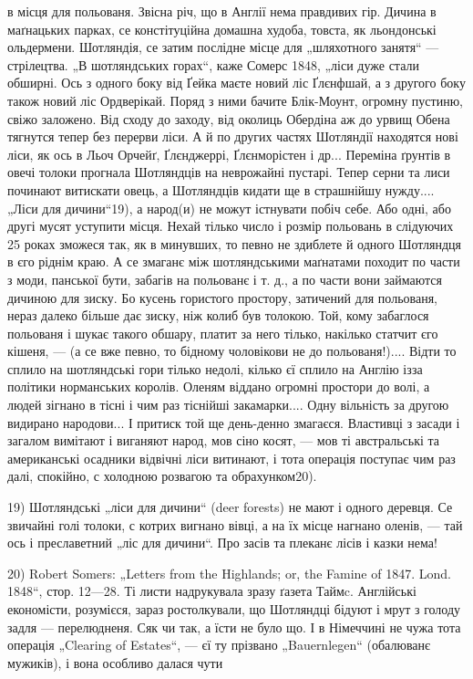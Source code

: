 в місця для польованя. Звісна річ, що в Англії нема правдивих гір. Дичина в маґнацьких парках, се констітуційна домашна худоба, товста, як льондонські ольдермени. Шотляндія, се затим послідне місце для „шляхотного занятя“ — стрілецтва. „В шотляндських горах“, каже Сомерс 1848, „ліси дуже стали обширні. Ось з одного боку від Ґейка маєте новий ліс Ґлєнфшай, а з другого боку також новий ліс Ордверікай. Поряд з ними бачите Блік-Моунт, огромну пустиню, свіжо заложено. Від сходу до заходу, від околиць Обердіна аж до урвищ Обена тягнутся тепер без перерви ліси. А й по других частях Шотляндії находятся нові ліси, як ось в Льоч Орчейґ, Ґлєнджеррі, Ґлєнморістен і др... Переміна ґрунтів в овечі толоки прогнала Шотляндців на неврожайні пустарі. Тепер серни та лиси починают витискати овець, а Шотляндців кидати ще в страшнійшу нужду.... „Ліси для дичини“19), а народ(и) не можут істнувати побіч себе. Або одні, або другі мусят уступити місця. Нехай тілько число і розмір польовань в слідуючих 25 роках зможеся так, як в минувших, то певно не здиблете й одного Шотляндця в єго ріднім краю. А се змаганє між шотляндськими маґнатами походит по части з моди, панської бути, забагів на польованє і т. д., а по части вони займаются дичиною для зиску. Бо кусень гористого простору, затичений для польованя, нераз далеко більше дає зиску, ніж колиб був толокою. Той, кому забаглося польованя і шукає такого обшару, платит за него тілько, накілько статчит єго кішеня,
— (а се вже певно, то бідному чоловікови не до польованя!).... Відти то сплило на шотляндські гори тілько недолі, кілько єї сплило на Англію ізза політики норманських
королів. Оленям віддано огромні простори до волі, а людей зігнано в тісні і чим раз тіснійші закамарки.... Одну вільність за другою видирано народови... І притиск той ще
день-денно змагаєся. Властивці з засади і загалом вимітают і виганяют народ, мов сіно косят, — мов ті австральські та американські осадники відвічні ліси витинают, і тота операція поступає чим раз далі, спокійно, с холодною розвагою та обрахунком20).

19) Шотляндські „ліси для дичини“ (deer forests) не мают і одного деревця. Се звичайні голі толоки, с котрих вигнано вівці, а на їх місце нагнано оленів, — тай ось і преславетний „ліс для дичини“. Про засів та плеканє лісів і казки нема!

20) Robert Somers: „Letters from the Highlands; or, the Famine of 1847. Lond. 1848“, стор. 12—28. Ті листи надрукувала зразу ґазета Таймc. Англійські економісти, розумієся, зараз ростолкували, що Шотляндці бідуют і мрут з голоду задля — перелюдненя. Сяк чи так, а їсти не було що. І в Німеччині не чужа тота операція „Clearing of Estates“, — єї ту прізвано „Bauernlegen“ (обалюванє мужиків), і вона особливо далася чути
